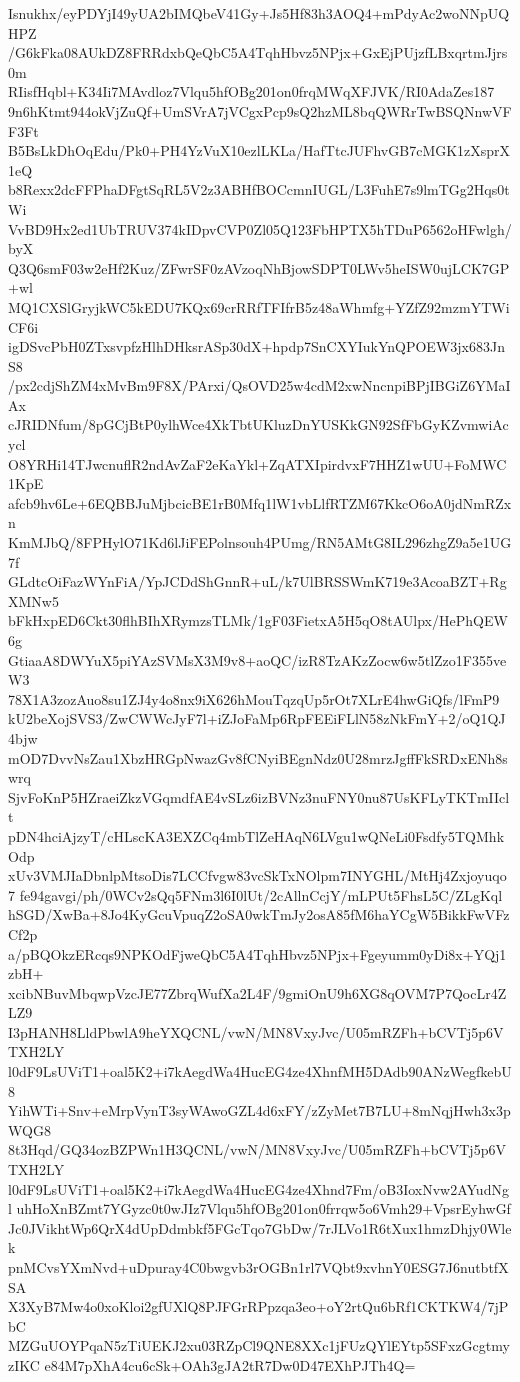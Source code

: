 Isnukhx/eyPDYjI49yUA2bIMQbeV41Gy+Js5Hf83h3AOQ4+mPdyAc2woNNpUQHPZ
/G6kFka08AUkDZ8FRRdxbQeQbC5A4TqhHbvz5NPjx+GxEjPUjzfLBxqrtmJjrs0m
RIisfHqbl+K34Ii7MAvdloz7Vlqu5hfOBg201on0frqMWqXFJVK/RI0AdaZes187
9n6hKtmt944okVjZuQf+UmSVrA7jVCgxPcp9sQ2hzML8bqQWRrTwBSQNnwVFF3Ft
B5BsLkDhOqEdu/Pk0+PH4YzVuX10ezlLKLa/HafTtcJUFhvGB7cMGK1zXsprX1eQ
b8Rexx2dcFFPhaDFgtSqRL5V2z3ABHfBOCcmnIUGL/L3FuhE7s9lmTGg2Hqs0tWi
VvBD9Hx2ed1UbTRUV374kIDpvCVP0Zl05Q123FbHPTX5hTDuP6562oHFwlgh/byX
Q3Q6smF03w2eHf2Kuz/ZFwrSF0zAVzoqNhBjowSDPT0LWv5heISW0ujLCK7GP+wl
MQ1CXSlGryjkWC5kEDU7KQx69crRRfTFIfrB5z48aWhmfg+YZfZ92mzmYTWiCF6i
igDSvcPbH0ZTxsvpfzHlhDHksrASp30dX+hpdp7SnCXYIukYnQPOEW3jx683JnS8
/px2cdjShZM4xMvBm9F8X/PArxi/QsOVD25w4cdM2xwNncnpiBPjIBGiZ6YMaIAx
cJRIDNfum/8pGCjBtP0ylhWce4XkTbtUKluzDnYUSKkGN92SfFbGyKZvmwiAcycl
O8YRHi14TJwcnuflR2ndAvZaF2eKaYkl+ZqATXIpirdvxF7HHZ1wUU+FoMWC1KpE
afcb9hv6Le+6EQBBJuMjbcicBE1rB0Mfq1lW1vbLlfRTZM67KkcO6oA0jdNmRZxn
KmMJbQ/8FPHylO71Kd6lJiFEPolnsouh4PUmg/RN5AMtG8IL296zhgZ9a5e1UG7f
GLdtcOiFazWYnFiA/YpJCDdShGnnR+uL/k7UlBRSSWmK719e3AcoaBZT+RgXMNw5
bFkHxpED6Ckt30flhBIhXRymzsTLMk/1gF03FietxA5H5qO8tAUlpx/HePhQEW6g
GtiaaA8DWYuX5piYAzSVMsX3M9v8+aoQC/izR8TzAKzZocw6w5tlZzo1F355veW3
78X1A3zozAuo8su1ZJ4y4o8nx9iX626hMouTqzqUp5rOt7XLrE4hwGiQfs/lFmP9
kU2beXojSVS3/ZwCWWcJyF7l+iZJoFaMp6RpFEEiFLlN58zNkFmY+2/oQ1QJ4bjw
mOD7DvvNsZau1XbzHRGpNwazGv8fCNyiBEgnNdz0U28mrzJgffFkSRDxENh8swrq
SjvFoKnP5HZraeiZkzVGqmdfAE4vSLz6izBVNz3nuFNY0nu87UsKFLyTKTmIIclt
pDN4hciAjzyT/cHLscKA3EXZCq4mbTlZeHAqN6LVgu1wQNeLi0Fsdfy5TQMhkOdp
xUv3VMJIaDbnlpMtsoDis7LCCfvgw83vcSkTxNOlpm7INYGHL/MtHj4Zxjoyuqo7
fe94gavgi/ph/0WCv2sQq5FNm3l6I0lUt/2cAllnCcjY/mLPUt5FhsL5C/ZLgKql
hSGD/XwBa+8Jo4KyGcuVpuqZ2oSA0wkTmJy2osA85fM6haYCgW5BikkFwVFzCf2p
a/pBQOkzERcqs9NPKOdFjweQbC5A4TqhHbvz5NPjx+Fgeyumm0yDi8x+YQj1zbH+
xcibNBuvMbqwpVzcJE77ZbrqWufXa2L4F/9gmiOnU9h6XG8qOVM7P7QocLr4ZLZ9
I3pHANH8LldPbwlA9heYXQCNL/vwN/MN8VxyJvc/U05mRZFh+bCVTj5p6VTXH2LY
l0dF9LsUViT1+oal5K2+i7kAegdWa4HucEG4ze4XhnfMH5DAdb90ANzWegfkebU8
YihWTi+Snv+eMrpVynT3syWAwoGZL4d6xFY/zZyMet7B7LU+8mNqjHwh3x3pWQG8
8t3Hqd/GQ34ozBZPWn1H3QCNL/vwN/MN8VxyJvc/U05mRZFh+bCVTj5p6VTXH2LY
l0dF9LsUViT1+oal5K2+i7kAegdWa4HucEG4ze4Xhnd7Fm/oB3IoxNvw2AYudNgl
uhHoXnBZmt7YGyzc0t0wJIz7Vlqu5hfOBg201on0frrqw5o6Vmh29+VpsrEyhwGf
Jc0JVikhtWp6QrX4dUpDdmbkf5FGcTqo7GbDw/7rJLVo1R6tXux1hmzDhjy0Wlek
pnMCvsYXmNvd+uDpuray4C0bwgvb3rOGBn1rl7VQbt9xvhnY0ESG7J6nutbtfXSA
X3XyB7Mw4o0xoKloi2gfUXlQ8PJFGrRPpzqa3eo+oY2rtQu6bRf1CKTKW4/7jPbC
MZGuUOYPqaN5zTiUEKJ2xu03RZpCl9QNE8XXc1jFUzQYlEYtp5SFxzGcgtmyzIKC
e84M7pXhA4cu6cSk+OAh3gJA2tR7Dw0D47EXhPJTh4Q=
